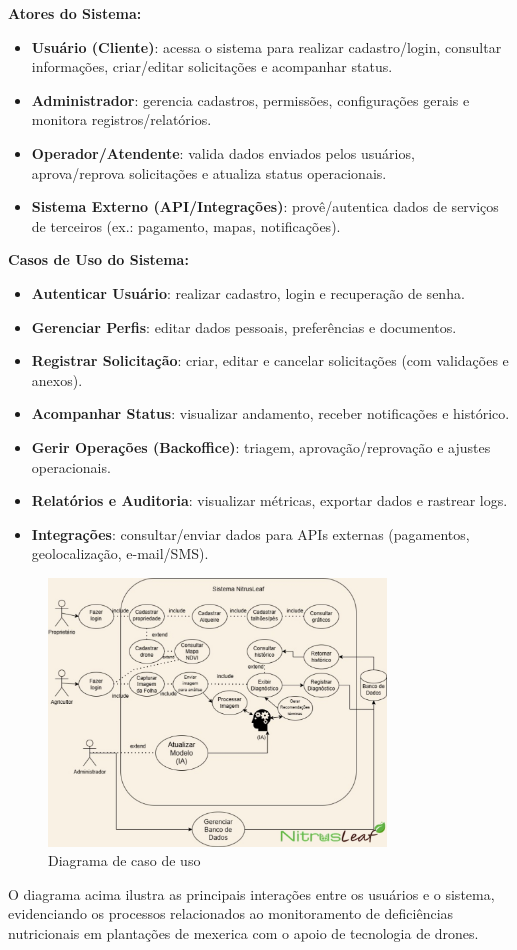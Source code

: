 \noindent\textbf{Atores do Sistema:}
\begin{itemize}[itemsep=0.6em, topsep=0.3em, parsep=0pt]
    \item \textbf{Usuário (Cliente)}: acessa o sistema para realizar cadastro/login, consultar informações, criar/editar solicitações e acompanhar status.
    \item \textbf{Administrador}: gerencia cadastros, permissões, configurações gerais e monitora registros/relatórios.
    \item \textbf{Operador/Atendente}: valida dados enviados pelos usuários, aprova/reprova solicitações e atualiza status operacionais.
    \item \textbf{Sistema Externo (API/Integrações)}: provê/autentica dados de serviços de terceiros (ex.: pagamento, mapas, notificações).
\end{itemize}

\vspace{0.9\baselineskip}

\noindent\textbf{Casos de Uso do Sistema:}
\begin{itemize}[itemsep=0.6em, topsep=0.3em, parsep=0pt]
    \item \textbf{Autenticar Usuário}: realizar cadastro, login e recuperação de senha.
    \item \textbf{Gerenciar Perfis}: editar dados pessoais, preferências e documentos.
    \item \textbf{Registrar Solicitação}: criar, editar e cancelar solicitações (com validações e anexos).
    \item \textbf{Acompanhar Status}: visualizar andamento, receber notificações e histórico.
    \item \textbf{Gerir Operações (Backoffice)}: triagem, aprovação/reprovação e ajustes operacionais.
    \item \textbf{Relatórios e Auditoria}: visualizar métricas, exportar dados e rastrear logs.
    \item \textbf{Integrações}: consultar/enviar dados para APIs externas (pagamentos, geolocalização, e-mail/SMS).
\end{itemize}

\begin{figure}[H]
\centering
\caption{Diagrama de caso de uso}
\label{fig:diagrama-caso-uso}
\includegraphics[width=0.8\textwidth]{Images/DiagramaCasosDeUso.jpg}
\end{figure}

O diagrama acima ilustra as principais interações entre os usuários e o sistema,
evidenciando os processos relacionados ao monitoramento de deficiências nutricionais
em plantações de mexerica com o apoio de tecnologia de drones.
\medskip